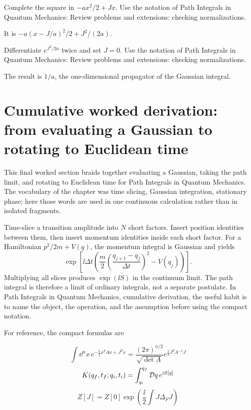 \begin{exercise}
Complete the square in \(-ax^2/2+Jx\).  Use the notation of Path Integrals in Quantum Mechanics: Review problems and extensions: checking normalizations.
\begin{answer}
It is \(-a(x-J/a)^2/2+J^2/(2a)\).
\end{answer}
\end{exercise}

\begin{exercise}
Differentiate \(e^{J^2/2a}\) twice and set \(J=0\).  Use the notation of Path Integrals in Quantum Mechanics: Review problems and extensions: checking normalizations.
\begin{answer}
The result is \(1/a\), the one-dimensional propagator of the Gaussian integral.
\end{answer}
\end{exercise}



\section{Cumulative worked derivation: from evaluating a Gaussian to rotating to Euclidean time}

This final worked section braids together evaluating a Gaussian, taking the path limit, and rotating to Euclidean time for Path Integrals in Quantum Mechanics.  The vocabulary of the chapter was time slicing, Gaussian integration, stationary phase; here those words are used in one continuous calculation rather than in isolated fragments.

Time-slice a transition amplitude into \(N\) short factors.  Insert position identities between them, then insert momentum identities inside each short factor.  For a Hamiltonian \(p^2/2m+V(q)\), the momentum integral is Gaussian and yields
\[
  \exp\left[\ii\Delta t\left(
  \frac{m}{2}\left(\frac{q_{j+1}-q_j}{\Delta t}\right)^2-V(q_j)
  \right)\right].
\]
Multiplying all slices produces \(\exp(\ii S)\) in the continuum limit.  The path integral is therefore a limit of ordinary integrals, not a separate postulate.  In Path Integrals in Quantum Mechanics, cumulative derivation, the useful habit is to name the object, the operation, and the assumption before using the compact notation.

For reference, the compact formulas are

\[
  \int\dd^n x\,e^{-\frac12x^TAx+J^Tx}=\frac{(2\pi)^{n/2}}{\sqrt{\det A}}e^{\frac12J^TA^{-1}J}
\]
\[
  K(q_f,t_f;q_i,t_i)=\int_{q_i}^{q_f}\mathcal D q\,e^{\mathrm i S[q]}
\]
\[
  Z[J]=Z[0]\exp\left(\frac{\ii}{2}\int J\Delta_FJ\right)
\]

